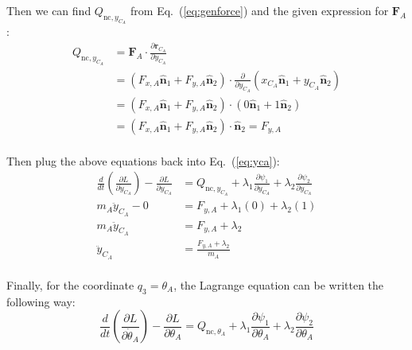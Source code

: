 \documentclass[titlepage]{article}
\begin{document}
Then we can find $Q_{\text{nc},y_{C_A}}$ from Eq.~(\ref{eq:genforce}) and the given expression for $\boldsymbol{F}_A$:
\begin{equation}
	\begin{split}
		Q_{\text{nc},y_{C_A}}&=\boldsymbol{F}_A\cdot\frac{\partial \boldsymbol{r}_{C_A}}{\partial y_{C_A}} \\
		&=\left(F_{x,A}\hat{\boldsymbol{n}}_1+F_{y,A}\hat{\boldsymbol{n}}_2\right)\cdot\frac{\partial}{\partial y_{C_A}}\left(x_{C_A}\hat{\boldsymbol{n}}_1+y_{C_A}\hat{\boldsymbol{n}}_2\right) \\
		&=\left(F_{x,A}\hat{\boldsymbol{n}}_1+F_{y,A}\hat{\boldsymbol{n}}_2\right)\cdot\left(0\hat{\boldsymbol{n}}_1+1\hat{\boldsymbol{n}}_2\right) \\
		&=\left(F_{x,A}\hat{\boldsymbol{n}}_1+F_{y,A}\hat{\boldsymbol{n}}_2\right)\cdot\hat{\boldsymbol{n}}_2=F_{y,A} \\
	\end{split}
\end{equation}

Then plug the above equations back into Eq.~(\ref{eq:yca}):
\begin{equation}
	\begin{split}
		\frac{d}{dt}\left(\frac{\partial L}{\partial\dot{y}_{C_A}}\right)-\frac{\partial L}{\partial y_{C_A}}&=Q_{\text{nc},y_{C_A}}+\lambda_1\frac{\partial\psi_1}{\partial y_{C_A}}+\lambda_2\frac{\partial\psi_2}{\partial y_{C_A}} \\
		m_A\ddot{y}_{C_A}-0&=F_{y,A}+\lambda_1(0)+\lambda_2(1) \\
		m_A\ddot{y}_{C_A}&=F_{y,A}+\lambda_2 \\
		\ddot{y}_{C_A}&=\frac{F_{y,A}+\lambda_2}{m_A} \\
	\end{split}
\end{equation}

Finally, for the coordinate $q_3=\theta_A$, the Lagrange equation can be written the following way:
\begin{equation}
	\frac{d}{dt}\left(\frac{\partial L}{\partial\dot{\theta}_A}\right)-\frac{\partial L}{\partial\theta_A}=Q_{\text{nc},\theta_A}+\lambda_1\frac{\partial\psi_1}{\partial\theta_A}+\lambda_2\frac{\partial\psi_2}{\partial\theta_A}
	\label{eq:thetaa}
\end{equation}
\end{document}
